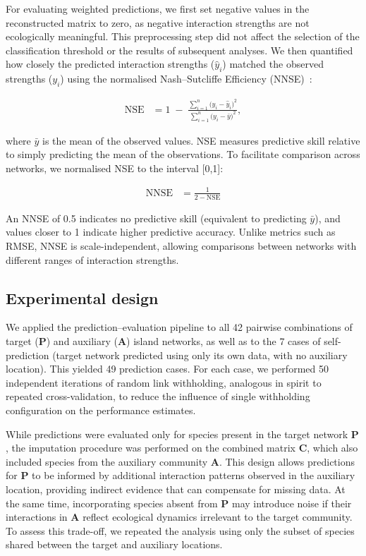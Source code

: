 \documentclass[oneside, a4paper, onecolumn, 11pt]{article}
\newcommand{\revtag}[1]{\textcolor{softcoral}{[#1]}}
\begin{document}
For evaluating weighted predictions, we first set negative values in the reconstructed matrix to zero, as negative interaction strengths are not ecologically meaningful. This preprocessing step did not affect the selection of the classification threshold or the results of subsequent analyses. %
We then quantified how closely the predicted interaction strengths ($\hat{y}_i$) matched the observed strengths ($y_i$) using the normalised Nash–Sutcliffe Efficiency (NNSE)~\citep{Dormann2025-rz}:

 \begin{align}
\mathrm{NSE} &= 1 \;-\; 
\frac{\displaystyle\sum_{i=1}^n \bigl(y_i - \hat{y}_i\bigr)^2}
     {\displaystyle\sum_{i=1}^n \bigl(y_i - \bar{y}\bigr)^2},
\end{align}

where $\bar{y}$ is the mean of the observed values. NSE measures predictive skill relative to simply predicting the mean of the observations. To facilitate comparison across networks, we normalised NSE to the interval [0,1]:
 
 \begin{align}
\mathrm{NNSE} &= \frac{1}{2 - \mathrm{NSE}}
\end{align}

An NNSE of 0.5 indicates no predictive skill (equivalent to predicting $\bar{y}$), and values closer to 1 indicate higher predictive accuracy. Unlike metrics such as RMSE, NNSE is scale-independent, allowing comparisons between networks with different ranges of interaction strengths.

\subsection{Experimental design}

We applied the prediction–evaluation pipeline to all 42 pairwise combinations of target ($\mathbf{P}$) and auxiliary ($\mathbf{A}$) island networks, as well as to the 7 cases of self-prediction (target network predicted using only its own data, with no auxiliary location). This yielded 49 prediction cases. For each case, we performed 50 independent iterations of random link withholding, analogous in spirit to repeated cross-validation, to reduce the influence of single withholding configuration on the performance estimates. 

While predictions were evaluated only for species present in the target network $\mathbf{P}$, the imputation procedure was performed on the combined matrix $\mathbf{C}$, which also included species from the auxiliary community $\mathbf{A}$. This design allows predictions for $\mathbf{P}$ to be informed by additional interaction patterns observed in the auxiliary location, providing indirect evidence that can compensate for missing data. At the same time, incorporating species absent from $\mathbf{P}$ may introduce noise if their interactions in $\mathbf{A}$ reflect ecological dynamics irrelevant to the target community. To assess this trade-off, we repeated the analysis using only the subset of species shared between the target and auxiliary locations.
\end{document}
